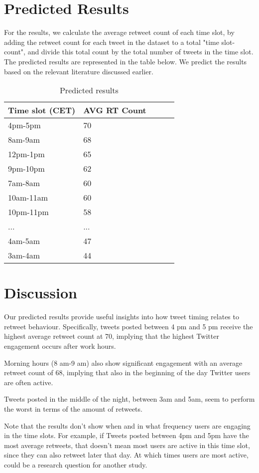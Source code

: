 \documentclass[11pt]{article}
\begin{document}
\section{Predicted Results}
For the results, we calculate the average retweet count of each time slot, by adding the retweet count for each tweet in the dataset to a total "time slot-count", and divide this total count by the total number of tweets in the time slot.
The predicted results are represented in the table below. We predict the results based on the relevant literature discussed earlier.


\begin{table}[hbtp]\centering
\begin{tabular}{p{2cm}p{4cm}p{4cm}p{3cm}p{3cm}}
    \toprule
    Time slot (CET) & AVG RT Count \\
    \midrule
    4pm-5pm & 70 \\
8am-9am & 68 \\
12pm-1pm & 65 \\
9pm-10pm & 62 \\
7am-8am & 60 \\
10am-11am & 60 \\
10pm-11pm & 58 \\
... & ... \\
4am-5am & 47 \\
3am-4am & 44 \\

    \bottomrule
  \end{tabular}
\caption{Predicted results}
\label{tbl: results}
\end{table}


\section{Discussion}
Our predicted results provide useful insights into how tweet timing relates to retweet behaviour. Specifically, tweets posted between 4 pm and 5 pm receive the highest average retweet count at 70, implying that the highest Twitter engagement occurs after work hours. 

Morning hours (8 am-9 am) also show significant engagement with an average retweet count of 68, implying that also in the beginning of the day Twitter users are often active.

Tweets posted in the middle of the night, between 3am and 5am, seem to perform the worst in terms of the amount of retweets.

Note that the results don't show when and in what frequency users are engaging in the time slots. For example, if Tweets posted between 4pm and 5pm have the most average retweets, that doesn't mean most users are active in this time slot, since they can also retweet later that day. At which times users are most active, could be a research question for another study.
\end{document}
